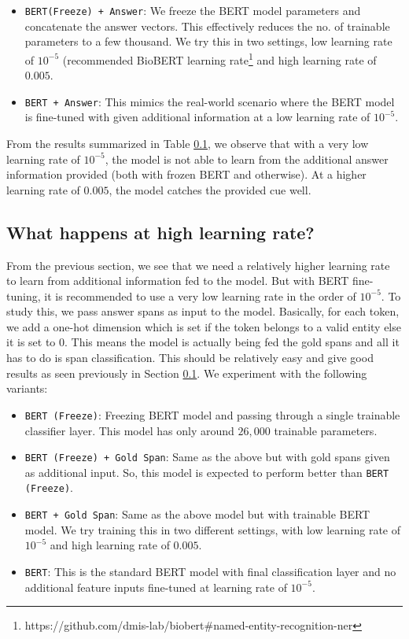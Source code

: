 \begin{itemize}
    \item \texttt{BERT(Freeze) + Answer}: We freeze the BERT model parameters and concatenate the answer vectors. This effectively reduces the no. of trainable parameters to a few thousand. We try this in two settings, low learning rate of $10^{-5}$ (recommended BioBERT learning rate\footnote{https://github.com/dmis-lab/biobert#named-entity-recognition-ner} and high learning rate of $0.005$.
    
    \item \texttt{BERT + Answer}: This mimics the real-world scenario where the BERT model is fine-tuned with given additional information at a low learning rate of $10^{-5}$.
\end{itemize}

From the results summarized in Table \ref{}, we observe that with a very low learning rate of $10^{-5}$, the model is not able to learn from the additional answer information provided (both with frozen BERT and otherwise). At a higher learning rate of $0.005$, the model catches the provided cue well.

\subsection{What happens at high learning rate?}

From the previous section, we see that we need a relatively higher learning rate to learn from additional information fed to the model. But with BERT fine-tuning, it is recommended to use a very low learning rate in the order of $10^{-5}$. To study this, we pass answer spans as input to the model. Basically, for each token, we add a one-hot dimension which is set if the token belongs to a valid entity else it is set to $0$. This means the model is actually being fed the gold spans and all it has to do is span classification. This should be relatively easy and give good results as seen previously in Section \ref{}. We experiment with the following variants:

\begin{itemize}
    \item \texttt{BERT (Freeze)}: Freezing BERT model and passing through a single trainable classifier layer. This model has only around $26,000$ trainable parameters. 
    
    \item \texttt{BERT (Freeze) + Gold Span}: Same as the above but with gold spans given as additional input. So, this model is expected to perform better than \texttt{BERT (Freeze)}.
    
    \item \texttt{BERT + Gold Span}: Same as the above model but with trainable BERT model. We try training this in two different settings, with low learning rate of $10^{-5}$ and high learning rate of $0.005$.
    
    \item \texttt{BERT}: This is the standard BERT model with final classification layer and no additional feature inputs fine-tuned at learning rate of $10^{-5}$.
\end{itemize}

